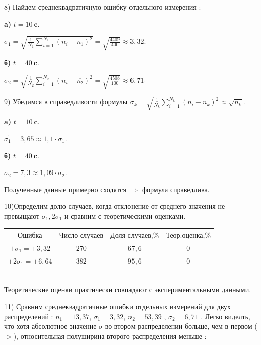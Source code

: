 \documentclass[a4paper,12pt]{article} %
\begin{document}
8) Найдем среднеквадратичную ошибку отдельного измерения :


{\bf a)} $t = 10\ \textbf{c}$.

$ \sigma_1 = \sqrt{\frac{1}{N_1}\sum\limits_{i = 1}^{N_1}(n_i - \overline{n_1})^2} = \sqrt{\frac{4409}{400}} \approx 3,32$.

\hspace{1mm}

{\bf б)} $t = 40\ \textbf{c}$.

$ \sigma_2 = \sqrt{\frac{1}{N_2}\sum\limits_{i = 1}^{N_2}(n_i - \overline{n_2})^2} = \sqrt{\frac{4508}{100}}\approx  6,71$.

9) Убедимся в справедливости формулы  $\sigma_k = \sqrt{\frac{1}{N_k}\sum\limits_{i = 1}^{N_k}(n_i - \overline{n_k})^2} \approx \sqrt{\overline{n_k}}$.

{\bf a)} $t = 10\ \textbf{c}$.

$ \sigma_1^{\textbf{'}} =  3,65 \approx 1,1\cdot \sigma_1$.

\hspace{1mm} 

{\bf б)} $t = 40\ \textbf{c}$.

$ \sigma_2^{\textbf{'}} =  7,3\approx 1,09\cdot\sigma_2$.

Полученные данные примерно сходятся $ \Rightarrow $ формула справедлива.

10)Определим долю случаев, когда отклонение от среднего значения не превыщают $\sigma_1,2\sigma_1$ и сравним с теоретическими оценками.

\begin{tabular}{ | c | c | c | c | }
\hline
$\textbf{Ошибка}$ & $\textbf{Число случаев}$ & $\textbf{Доля случаев,\%}$ & $\textbf{Теор.оценка,\% }$\\ \hline
$\pm \sigma_1 = \pm 3,32$ & $270$ & $67,6$ & $0$\\ \hline
$\pm 2\sigma_1 = \pm 6,64$  & $382$ & $95,6$ & $0$\\
\hline 
\end{tabular}\\

Теоретические оценки практически совпадают с экспериментальными данными.

11) Сравним среднеквадратичные ошибки отдельных измерений для двух распределений : $\overline{n_1} = 13,37$, $\sigma_1 = 3,32$, $\overline{n_2} = 53,39$ , $\sigma_2 = 6,71$ . Легко виделть, что хотя абсолютное значение $\sigma$ во втором распределении больше, чем в первом ($ > $), относительная полуширина второго распределения меньше :
\end{document}
